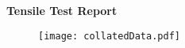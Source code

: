 \documentclass[11pt]{article}
\begin{document}
\begin{center}
    \huge
    \textbf{Tensile Test Report}
\end{center}


\begin{figure}[ht]
    \vspace*{-.0cm}
    \centering
    \texttt{[image: collatedData.pdf]}
    \label{fig:plot}
\end{figure}



\pagebreak
\end{document}
